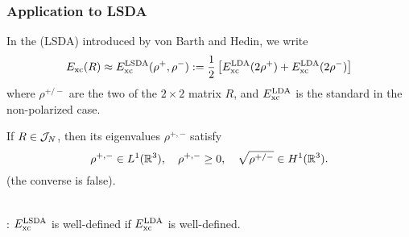 \documentclass[9pt,xcolor=dvipsnames]{beamer}
\begin{document}
\begin{frame}

\frametitle{Application to LSDA}

In the  (LSDA) introduced by von Barth and Hedin\footnotemark, we write
\begin{equation} \label{vonBarth}
	E_{\mathrm{xc}}(R) \approx E_{\mathrm{xc}}^{\mathrm{LSDA}}(\rho^+, \rho^-) := \dfrac12 \left[ E_{\mathrm{xc}}^{\mathrm{LDA}} (2 \rho^+) + E^{\mathrm{LDA}}_{\mathrm{xc}} (2 \rho^-) \right]
\end{equation}
where $\rho^{+/-}$ are the two  of the $2 \times 2$ matrix $R$, and $E_{\mathrm{xc}}^{\mathrm{LDA}}$ is the standard  in the non-polarized case.\\


\begin{lemma}[DG 2013]
	If $R \in {\mathcal J}_N$, then its eigenvalues $\rho^{+,-}$ satisfy
	\[
		\rho^{+,-} \in L^1({\mathbb R}^3),  \quad \rho^{+,-} \ge 0, \quad \sqrt{\rho^{+/-}} \in H^1({\mathbb R}^3).
	\]
	(the converse is false).
\end{lemma}
~\\
: $E_{\mathrm{xc}}^{\mathrm{LSDA}}$ is well-defined if $E_{\mathrm{xc}}^{\mathrm{LDA}}$ is well-defined.



\addtocounter{footnote}{-1}

\end{frame}



\end{document}
